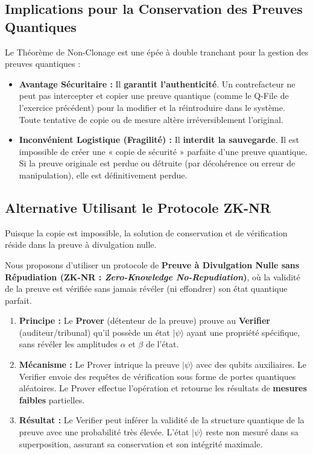 \documentclass[12pt,a4paper]{report}
\begin{document}
\subsection*{Implications pour la Conservation des Preuves Quantiques}

Le Théorème de Non-Clonage est une épée à double tranchant pour la gestion des preuves quantiques :

\begin{itemize}
	\item \textbf{Avantage Sécuritaire :} Il \textbf{garantit l'authenticité}. Un contrefacteur ne peut pas intercepter et copier une preuve quantique (comme le Q-File de l'exercice précédent) pour la modifier et la réintroduire dans le système. Toute tentative de copie ou de mesure altère irréversiblement l'original.
	\item \textbf{Inconvénient Logistique (Fragilité) :} Il \textbf{interdit la sauvegarde}. Il est impossible de créer une « copie de sécurité » parfaite d'une preuve quantique. Si la preuve originale est perdue ou détruite (par décohérence ou erreur de manipulation), elle est définitivement perdue.
\end{itemize}

\subsection*{Alternative Utilisant le Protocole ZK-NR}

Puisque la copie est impossible, la solution de conservation et de vérification réside dans la preuve à divulgation nulle.

Nous proposons d'utiliser un protocole de \textbf{Preuve à Divulgation Nulle sans Répudiation (ZK-NR : \textit{Zero-Knowledge No-Repudiation})}, où la validité de la preuve est vérifiée sans jamais révéler (ni effondrer) son état quantique parfait.

\begin{enumerate}
	\item \textbf{Principe :} Le \textbf{Prover} (détenteur de la preuve) prouve au \textbf{Verifier} (auditeur/tribunal) qu'il possède un état $|\psi\rangle$ ayant une propriété spécifique, sans révéler les amplitudes $\alpha$ et $\beta$ de l'état.
	\item \textbf{Mécanisme :} Le Prover intrique la preuve $|\psi\rangle$ avec des qubits auxiliaires. Le Verifier envoie des requêtes de vérification sous forme de portes quantiques aléatoires. Le Prover effectue l'opération et retourne les résultats de \textbf{mesures faibles} partielles.
	\item \textbf{Résultat :} Le Verifier peut inférer la validité de la structure quantique de la preuve avec une probabilité très élevée. L'état $|\psi\rangle$ reste non mesuré dans sa superposition, assurant sa conservation et son intégrité maximale.
\end{enumerate}
\end{document}
